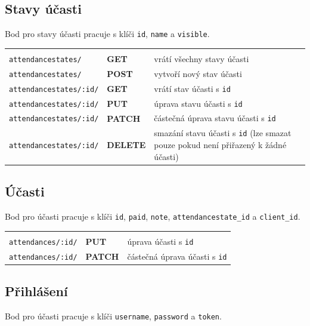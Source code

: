         \subsection{Stavy účasti}
        Bod pro stavy účasti pracuje s klíči \verb|id|, \verb|name| a \verb|visible|.
        
            {\centering
            \begin{tabular}{p{\apiA\textwidth} p{\apiB\textwidth} p{\apiC\textwidth}}&&\\
                \verb|attendancestates/|    & \textbf{GET}      & vrátí všechny stavy účasti\\
                \verb|attendancestates/|    & \textbf{POST}     & vytvoří nový stav účasti\\
                \verb|attendancestates/:id/|& \textbf{GET}      & vrátí stav účasti s \verb|id|\\
                \verb|attendancestates/:id/|& \textbf{PUT}      & úprava stavu účasti s \verb|id|\\
                \verb|attendancestates/:id/|& \textbf{PATCH}    & částečná úprava stavu účasti s \verb|id|\\
                \verb|attendancestates/:id/|& \textbf{DELETE}   & smazání stavu účasti s \verb|id| (lze smazat pouze pokud není přiřazený k žádné účasti)\\
            \end{tabular}}
            
        \subsection{Účasti}
        Bod pro účasti pracuje s klíči \verb|id|, \verb|paid|, \verb|note|, \verb|attendancestate_id| a \verb|client_id|.
        
            {\centering
            \begin{tabular}{p{\apiA\textwidth} p{\apiB\textwidth} p{\apiC\textwidth}}&&\\
                \verb|attendances/:id/|     & \textbf{PUT}      & úprava účasti s \verb|id|\\
                \verb|attendances/:id/|     & \textbf{PATCH}    & částečná úprava účasti s \verb|id|\\
            \end{tabular}}
            
        \subsection{Přihlášení}
        Bod pro účasti pracuje s klíči \verb|username|, \verb|password| a \verb|token|.
        
